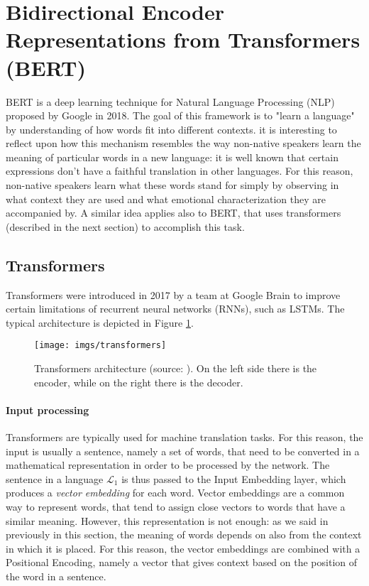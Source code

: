 \documentclass[target=mst,aauheader=aics]{thud}
\theoremstyle{definition}
\begin{document}
	\section{Bidirectional Encoder Representations from Transformers (BERT)}
	BERT \cite{Devlin2018} is a deep learning technique for Natural Language Processing (NLP) proposed by Google in 2018. The goal of this framework is to "learn a language" by understanding of how words fit into different contexts. it is interesting to reflect upon how this mechanism resembles the way non-native speakers learn the meaning of particular words in a new language: it is well known that certain expressions don't have a faithful translation in other languages. For this reason, non-native speakers learn what these words stand for simply by observing in what context they are used and what emotional characterization they are accompanied by. A similar idea applies also to BERT, that uses transformers (described in the next section) to accomplish this task.
	
	\subsection{Transformers}
	Transformers \cite{Vaswani2017} were introduced in 2017 by a team at Google Brain to improve certain limitations of recurrent neural networks (RNNs), such as LSTMs. The typical architecture is depicted in Figure \ref{fig:transformer}.
	\begin{figure}
		\centering
		\texttt{[image: imgs/transformers]}
		\captionsetup{width=.7\linewidth}
		\caption{Transformers architecture (source: \cite{Vaswani2017}). On the left side there is the encoder, while on the right there is the decoder.}
		\label{fig:transformer}
	\end{figure}
	
	\paragraph{Input processing}
	Transformers are typically used for machine translation tasks. For this reason, the input is usually a sentence, namely a set of words, that need to be converted in a mathematical representation in order to be processed by the network. The sentence in a language $\mathcal{L}_1$ is thus passed to the Input Embedding layer, which produces a \textit{vector embedding} for each word. Vector embeddings are a common way to represent words, that tend to assign close vectors to words that have a similar meaning. However, this representation is not enough: as we said in previously in this section, the meaning of words depends on also from the context in which it is placed. For this reason, the vector embeddings are combined with a Positional Encoding, namely a vector that gives context based on the position of the word in a sentence. 
	
\end{document}
